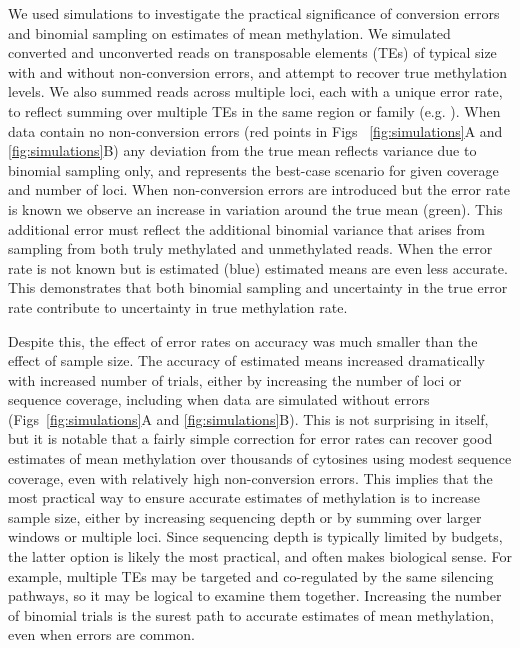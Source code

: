\documentclass[10pt,draft,letterpaper]{article}
\begin{document}
We used simulations to investigate the practical significance of conversion errors and binomial sampling on estimates of mean methylation.
We simulated converted and unconverted reads on transposable elements (TEs) of typical size with and without non-conversion errors, and attempt to recover true methylation levels.
We also summed reads across multiple loci, each with a unique error rate, to reflect summing over multiple TEs in the same region or family (e.g. \cite{sasaki2019common}).
When data contain no non-conversion errors (red points in Figs ~\ref{fig:simulations}A and \ref{fig:simulations}B) any deviation from the true mean reflects variance due to binomial sampling only, and represents the best-case scenario for given coverage and number of loci.
When non-conversion errors are introduced but the error rate is known we observe an increase in variation around the true mean (green).
This additional error must reflect the additional binomial variance that arises from sampling from both truly methylated and unmethylated reads.
When the error rate is not known but is estimated (blue) estimated means are even less accurate.
This demonstrates that both binomial sampling and uncertainty in the true error rate contribute to uncertainty in true methylation rate.

Despite this, the effect of error rates on accuracy was much smaller than the effect of sample size.
The accuracy of estimated means increased dramatically with increased number of trials, either by increasing the number of loci or sequence coverage, including when data are simulated without errors (Figs~\ref{fig:simulations}A and \ref{fig:simulations}B).
This is not surprising in itself, but it is notable that a fairly simple correction for error rates can recover good estimates of mean methylation over thousands of cytosines using modest sequence coverage, even with relatively high non-conversion errors.
This implies that the most practical way to ensure accurate estimates of methylation is to increase sample size, either by increasing sequencing depth or by summing over larger windows or multiple loci.
Since sequencing depth is typically limited by budgets, the latter option is likely the most practical, and often makes biological sense.
For example, multiple TEs may be targeted and co-regulated by the same silencing pathways, so it may be logical to examine them together.
Increasing the number of binomial trials is the surest path to accurate estimates of mean methylation, even when errors are common.
\end{document}
